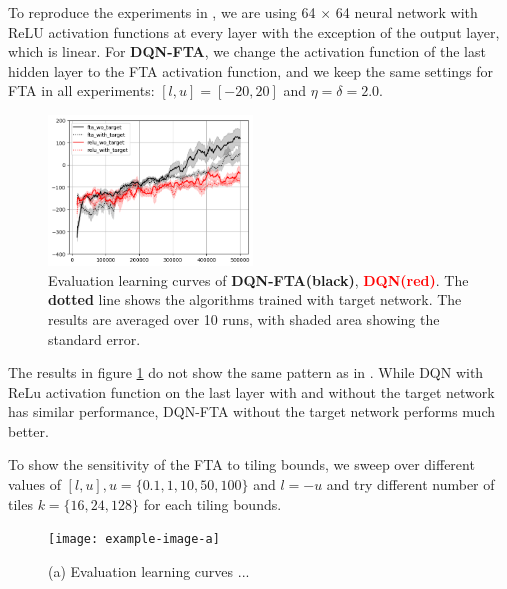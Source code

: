 \documentclass{article}
\begin{document}
To reproduce the experiments in \cite{pan2019fuzzy}, we are using 64 $\times$ 64 neural network with ReLU activation functions at every layer with the exception of the output layer, which is linear. For {\bf DQN-FTA}, we change the activation function of the last hidden layer to the FTA activation function, and we keep the same settings for FTA in all experiments: $[l, u] = [-20, 20]$ and $\eta = \delta = 2.0$.

\begin{figure}[h]
    \centering
    \includegraphics[height=4cm]{ftavrelu.png}
    \caption{Evaluation learning curves of {\bf DQN-FTA(black)}, {\textcolor{red} {\bf DQN(red)}}. The {\bf dotted} line shows the algorithms trained with target network. The results are averaged over 10 runs, with shaded area showing the standard error.}
    \label{fig:ftavrelu}
\end{figure}

The results in figure \ref{fig:ftavrelu} do not show the same pattern as in \cite{pan2019fuzzy}. While DQN with ReLu activation function on the last layer with and without the target network has similar performance, DQN-FTA without the target network performs much better.
\newpage

To show the sensitivity of the FTA to tiling bounds, we sweep over different values of $[l, u], u = \{0.1,1,10,50,100\}$ and $l = -u$ and try different number of tiles $k= \{16, 24, 128\}$ for each tiling bounds.

\begin{figure}[h]
    \centering
    \texttt{[image: example-image-a]}
    \caption{(a) Evaluation learning curves ...}
    \label{fig:sweepfta}
\end{figure}
\end{document}
